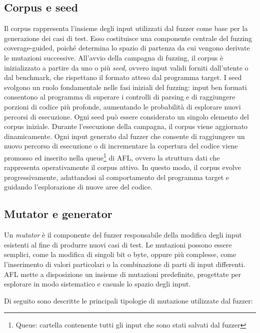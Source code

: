 \subsection{Corpus e seed}
Il corpus rappresenta l’insieme degli input utilizzati dal fuzzer come base per la generazione dei casi di test. Esso costituisce una componente centrale del fuzzing coverage-guided, poiché determina lo spazio di partenza da cui vengono derivate le mutazioni successive.
All’avvio della campagna di fuzzing, il corpus è inizializzato a partire da uno o più \textit{seed}, ovvero input validi forniti dall’utente o dal benchmark, che rispettano il formato atteso dal programma target.
I seed svolgono un ruolo fondamentale nelle fasi iniziali del fuzzing: input ben formati consentono al programma di superare i controlli di parsing e di raggiungere porzioni di codice più profonde, aumentando le probabilità di esplorare nuovi percorsi di esecuzione. Ogni seed può essere considerato un singolo elemento del corpus iniziale.
Durante l'esecuzione della campagna, il corpus viene aggiornato dinamicamente.
Ogni input generato dal fuzzer che consente di raggiungere un nuovo percorso di esecuzione o di incrementare la copertura del codice viene promosso ed inserito nella queue\footnote{Queue: cartella contenente tutti gli input che sono stati salvati dal fuzzer} di AFL, ovvero la struttura dati che rappresenta operativamente il corpus attivo.
In questo modo, il corpus evolve progressivamente, adattandosi al comportamento del programma target e guidando l'esplorazione di nuove aree del codice.

\subsection{Mutator e generator}
Un \textit{mutator} è il componente del fuzzer responsabile della modifica degli input esistenti al fine di produrre nuovi casi di test.
Le mutazioni possono essere semplici, come la modifica di singoli bit o byte, oppure più complesse, come l'inserimento di valori particolari o la combinazione di parti di input differenti.
AFL mette a disposizione un insieme di mutazioni predefinite, progettate per esplorare in modo sistematico e casuale lo spazio degli input.

\noindent
Di seguito sono descritte le principali tipologie di mutazione utilizzate dal fuzzer:

